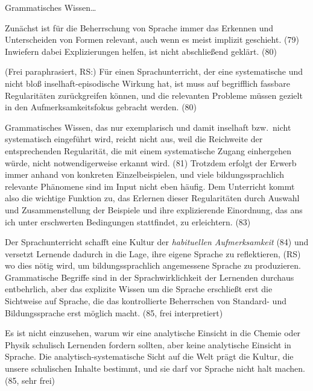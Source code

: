 Grammatisches Wissen\ldots

Zunächst ist für die Beherrschung von Sprache immer das Erkennen und Unterscheiden von Formen relevant, auch wenn es meist implizit geschieht. (79)
Inwiefern dabei Explizierungen helfen, ist nicht abschließend geklärt. (80)

(Frei paraphrasiert, RS:) Für einen Sprachunterricht, der eine systematische und nicht bloß inselhaft-episodische Wirkung hat, ist muss auf begrifflich fassbare Regularitäten zurückgreifen können, und die relevanten Probleme müssen gezielt in den Aufmerksamkeitsfokus gebracht werden. (80)

Grammatisches Wissen, das nur exemplarisch und damit inselhaft bzw.\ nicht systematisch eingeführt wird, reicht nicht aus, weil die Reichweite der entsprechenden Regularität, die mit einem systematische Zugang einhergehen würde, nicht notwendigerweise erkannt wird. (81)
Trotzdem erfolgt der Erwerb immer anhand von konkreten Einzelbeispielen, und viele bildungssprachlich relevante Phänomene sind im Input nicht eben häufig.
Dem Unterricht kommt also die wichtige Funktion zu, das Erlernen dieser Regularitäten durch Auswahl und Zusammenstellung der Beispiele und ihre explizierende Einordnung, das ans ich unter erschwerten Bedingungen stattfindet, zu erleichtern. (83)

Der Sprachunterricht schafft eine Kultur der \textit{habituellen Aufmerksamkeit} (84) und versetzt Lernende dadurch in die Lage, ihre eigene Sprache zu reflektieren, (RS) wo dies nötig wird, um bildungssprachlich angemessene Sprache zu produzieren.
Grammatische Begriffe sind in der Sprachwirklichkeit der Lernenden durchaus entbehrlich, aber das explizite Wissen um die Sprache erschließt erst die Sichtweise auf Sprache, die das kontrollierte Beherrschen von Standard- und Bildungssprache erst möglich macht. (85, frei interpretiert)

Es ist nicht einzusehen, warum wir eine analytische Einsicht in die Chemie oder Physik schulisch Lernenden fordern sollten, aber keine analytische Einsicht in Sprache.
Die analytisch-systematische Sicht auf die Welt prägt die Kultur, die unsere schulischen Inhalte bestimmt, und sie darf vor Sprache nicht halt machen. (85, sehr frei)


\paragraph{\citet{Menzel2017}}

